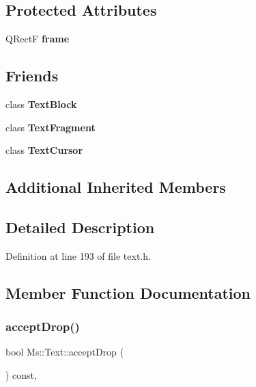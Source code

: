 \subsection*{Protected Attributes}
\begin{DoxyCompactItemize}
\item 
\mbox{\label{class_ms_1_1_text_a6e0fe3cca5add37136bca0bb3cfc2d9e}} 
Q\+RectF {\bfseries frame}
\end{DoxyCompactItemize}
\subsection*{Friends}
\begin{DoxyCompactItemize}
\item 
\mbox{\label{class_ms_1_1_text_a10941693a31766eabb041642470df529}} 
class {\bfseries Text\+Block}
\item 
\mbox{\label{class_ms_1_1_text_a8b4f9a4b0426c3f63d04756154377b4b}} 
class {\bfseries Text\+Fragment}
\item 
\mbox{\label{class_ms_1_1_text_add8fbfbe3835b4f8103aafc56815b187}} 
class {\bfseries Text\+Cursor}
\end{DoxyCompactItemize}
\subsection*{Additional Inherited Members}


\subsection{Detailed Description}


Definition at line 193 of file text.\+h.



\subsection{Member Function Documentation}
\mbox{\label{class_ms_1_1_text_ad2cd890960721f25a8d4721031fa45f8}} 
\subsubsection{\texorpdfstring{accept\+Drop()}{acceptDrop()}}
{\footnotesize\ttfamily bool Ms\+::\+Text\+::accept\+Drop (\begin{DoxyParamCaption}\item[{\hyperlink{class_ms_1_1_edit_data}{Edit\+Data} \&}]{ }\end{DoxyParamCaption}) const\hspace{0.3cm}{\ttfamily [override]}, {\ttfamily [virtual]}}

